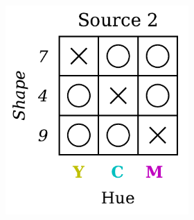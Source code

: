 \begin{definition}
\begin{figure}[H]
\begin{subfigure}[b]{0.45\textwidth}
\begin{subfigure}[b]{0.48\textwidth}
                \includegraphics[width=\textwidth]{img/datasets/ZGO_fact=hue_env=1.pdf}
            \end{subfigure}
        \end{subfigure}
        \hfill
        \begin{subfigure}[b]{0.45\textwidth}
            \centering
            \begin{subfigure}[b]{0.48\textwidth}
                \centering

\end{subfigure}
\end{subfigure}
\end{figure}
\end{definition}
